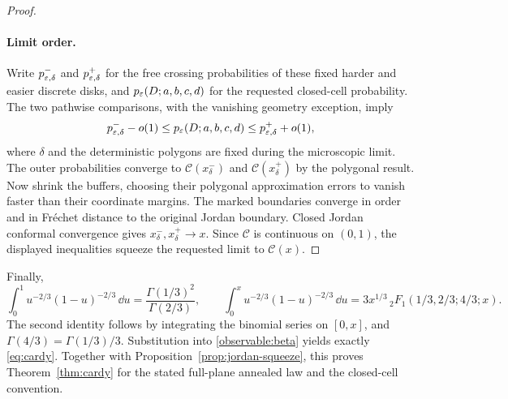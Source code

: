 \begin{proof}
\paragraph{Limit order.}
Write $p^-_{\varepsilon,\delta}$ and $p^+_{\varepsilon,\delta}$ for the free crossing
probabilities of these fixed harder and easier discrete disks, and
$p_\varepsilon(D;a,b,c,d)$ for the requested closed-cell probability. The two
pathwise comparisons, with the vanishing geometry exception, imply
\[
 p^-_{\varepsilon,\delta}-o(1)
 \le p_\varepsilon(D;a,b,c,d)
 \le p^+_{\varepsilon,\delta}+o(1),
\]
where $\delta$ and the deterministic polygons are fixed during the
microscopic limit. The outer probabilities converge to
$\mathcal C(x^-_\delta)$ and $\mathcal C(x^+_\delta)$ by the polygonal
result. Now shrink the buffers, choosing their polygonal approximation
errors to vanish faster than their coordinate margins. The marked
boundaries converge in order and in Fr\'echet distance to the original
Jordan boundary. Closed Jordan conformal convergence gives
$x^-_\delta,x^+_\delta\to x$. Since $\mathcal C$ is continuous on
$(0,1)$, the displayed inequalities squeeze the requested limit to
$\mathcal C(x)$.
\end{proof}

Finally,
\[
 \int_0^1u^{-2/3}(1-u)^{-2/3}\,\dd u
             =\frac{\Gamma(1/3)^2}{\Gamma(2/3)},\qquad
 \int_0^xu^{-2/3}(1-u)^{-2/3}\,\dd u
             =3x^{1/3}\,{}_2F_1(1/3,2/3;4/3;x).
\]
The second identity follows by integrating the binomial series on
$[0,x]$, and $\Gamma(4/3)=\Gamma(1/3)/3$. Substitution into
\eqref{observable:beta} yields exactly \eqref{eq:cardy}. Together with
Proposition~\ref{prop:jordan-squeeze}, this proves
Theorem~\ref{thm:cardy} for the stated full-plane annealed law and the
closed-cell convention.
